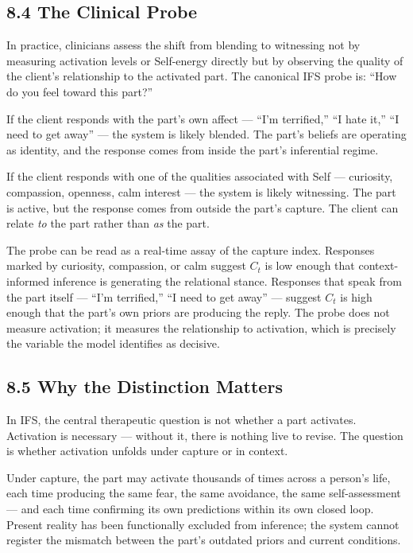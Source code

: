 \documentclass[11pt]{article}
\begin{document}
\subsection{8.4 The Clinical Probe}\label{the-clinical-probe}

In practice, clinicians assess the shift from blending to witnessing not
by measuring activation levels or Self-energy directly but by observing
the quality of the client's relationship to the activated part. The
canonical IFS probe is: ``How do you feel toward this part?''

If the client responds with the part's own affect --- ``I'm terrified,''
``I hate it,'' ``I need to get away'' --- the system is likely blended.
The part's beliefs are operating as identity, and the response comes
from inside the part's inferential regime.

If the client responds with one of the qualities associated with Self
--- curiosity, compassion, openness, calm interest --- the system is
likely witnessing. The part is active, but the response comes from
outside the part's capture. The client can relate \emph{to} the part
rather than \emph{as} the part.

The probe can be read as a real-time assay of the capture index.
Responses marked by curiosity, compassion, or calm suggest \(C_t\) is
low enough that context-informed inference is generating the relational
stance. Responses that speak from the part itself --- ``I'm terrified,''
``I need to get away'' --- suggest \(C_t\) is high enough that the
part's own priors are producing the reply. The probe does not measure
activation; it measures the relationship to activation, which is
precisely the variable the model identifies as decisive.

\subsection{8.5 Why the Distinction
Matters}\label{why-the-distinction-matters}

In IFS, the central therapeutic question is not whether a part
activates. Activation is necessary --- without it, there is nothing live
to revise. The question is whether activation unfolds under capture or
in context.

Under capture, the part may activate thousands of times across a
person's life, each time producing the same fear, the same avoidance,
the same self-assessment --- and each time confirming its own
predictions within its own closed loop. Present reality has been
functionally excluded from inference; the system cannot register the
mismatch between the part's outdated priors and current conditions.
\end{document}
